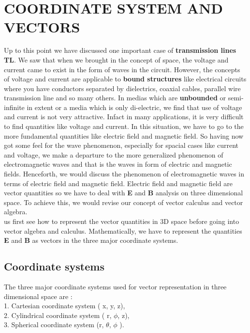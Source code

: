 \chapter{COORDINATE SYSTEM AND VECTORS}
	Up to this point we have discussed one important case of \textbf{transmission lines TL}. We saw that when we brought in the concept of space, the voltage and current came to exist in the form of waves in the circuit. However, the concepts of voltage and current are applicable to \textbf{bound structures} like electrical circuits where you have conductors separated by dielectrics, coaxial cables, parallel wire transmission line and so many others. In medias which are \textbf{unbounded} or semi- infinite in extent or a media which is only di-electric, we find that use of voltage and current is not very attractive. Infact in many applications, it is very difficult to find quantities like voltage and current. In this situation, we have to go to the more fundamental quantities like electric field and magnetic field. So having now got some feel for the wave phenomenon, especially for spacial cases like current and voltage, we make a departure to the more generalized phenomenon of electromagnetic waves and that is the waves in form of electric and magnetic fields. Henceforth, we would discuss the phenomenon of electromagnetic waves in terms of electric field and magnetic field. Electric field and magnetic field are vector quantities so we have to deal with \textbf{E} and \textbf{B} analysis on three dimensional space. To achieve this, we would revise our concept of vector calculus and vector algebra.\\
	 us first see how to represent the vector quantities in 3D space before going into vector algebra and calculus. Mathematically, we have to represent the quantities \textbf{E} and \textbf{B} as vectors in the three major coordinate systems.
	\section{Coordinate systems}
	The three major coordinate systems  used for vector representation in three dimensional space are :\\
	1. Cartesian coordinate system ( x, y, z),\\
	2. Cylindrical coordinate system ( r, $\phi$, z),\\
	3. Spherical coordinate system (r,  $\theta$, $\phi$ ).
